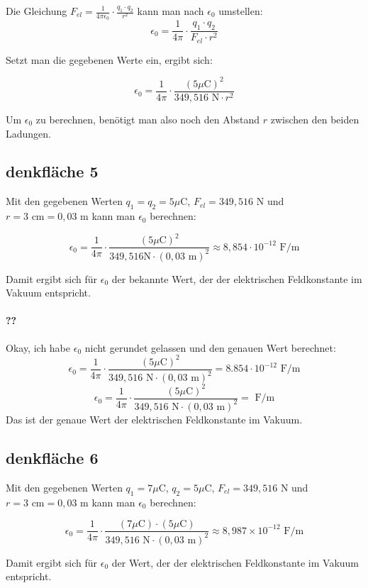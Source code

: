 \documentclass[a4paper]{report}
\begin{document}
Die Gleichung $F_{el}=\frac{1}{4\pi\epsilon_0} \cdot \frac{q_1 \cdot q_2}{r^2}$
kann man nach $\epsilon_0$ umstellen:
$$\epsilon_0 = \frac{1}{4\pi}\cdot \frac{q_1 \cdot q_2}{F_{el}\cdot r^2}$$

Setzt man die gegebenen Werte ein, ergibt sich:

$$\epsilon_0 = \frac{1}{4\pi}\cdot \frac{(5\mu\text{C})^2}{349,516\text{ N}\cdot r^2}$$

Um $\epsilon_0$ zu berechnen, benötigt man also noch den Abstand $r$ zwischen den beiden Ladungen.

\subsection{denkfläche 5}
Mit den gegebenen Werten $q_1=q_2=5\mu\text{C}$, $F_{el}=349,516\text{ N}$ und
$r=3\text{ cm}=0,03\text{ m}$ kann man $\epsilon_0$ berechnen:

$$\epsilon_0 = \frac{1}{4\pi}\cdot \frac{(5\mu\text{C})^2}{349,516\text{
N}\cdot (0,03\text{ m})^2} \approx 8,854\cdot 10^{-12} \text{ F/m}$$

Damit ergibt sich für $\epsilon_0$ der bekannte Wert, der der elektrischen
Feldkonstante im Vakuum entspricht.

\paragraph{??} %

Okay, ich habe $\epsilon_0$ nicht gerundet gelassen und den genauen Wert
berechnet:
$$\epsilon_0 = \frac{1}{4\pi}\cdot \frac{(5\mu\text{C})^2}{349,516\text{ N}\cdot (0,03\text{ m})^2} = 8.854\cdot 10^{-12} \text{ F/m}$$
$$\epsilon_0 = \frac{1}{4\pi}\cdot \frac{(5\mu\text{C})^2}{349,516\text{ N}\cdot (0,03\text{ m})^2} =  \text{ F/m}$$
Das ist der genaue Wert der elektrischen Feldkonstante im Vakuum.

\subsection{denkfläche 6}
Mit den gegebenen Werten $q_1=7\mu\text{C}$, $q_2=5\mu\text{C}$,
$F_{el}=349,516\text{ N}$ und $r=3\text{ cm}=0,03\text{ m}$ kann man
$\epsilon_0$ berechnen:

$$\epsilon_0 = \frac{1}{4\pi}\cdot \frac{(7\mu\text{C}) \cdot
(5\mu\text{C})}{349,516\text{ N}\cdot (0,03\text{ m})^2} \approx 8,987\times
10^{-12} \text{ F/m}$$

Damit ergibt sich für $\epsilon_0$ der Wert, der der elektrischen Feldkonstante
im Vakuum entspricht.
\end{document}
